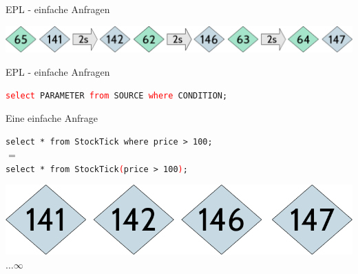 \documentclass{beamer}
\begin{document}
\begin{frame}{EPL - einfache Anfragen}
    \begin{center}
        \includegraphics[scale=0.35]{img/stream-1}
    \end{center}    

\begin{exampleblock}{\centering EPL - einfache Anfragen}
    \begin{center}
         \texttt{\textcolor{red}{select} PARAMETER \textcolor{red}{from} SOURCE 
            \textcolor{red}{where} CONDITION;}
    \end{center}
\end{exampleblock}

\begin{exampleblock}{\centering Eine einfache Anfrage}
    \begin{center}
        \texttt{select * from StockTick where price > 100;}\\
        $=$\\
        \texttt{select * from StockTick\textcolor{red}{(}price > 100\textcolor{red}{)};}
    \end{center}
\end{exampleblock}

\begin{center}
    \includegraphics[scale=0.2]{img/solution-1}$\dots \infty$
\end{center}
\end{frame}
\end{document}
